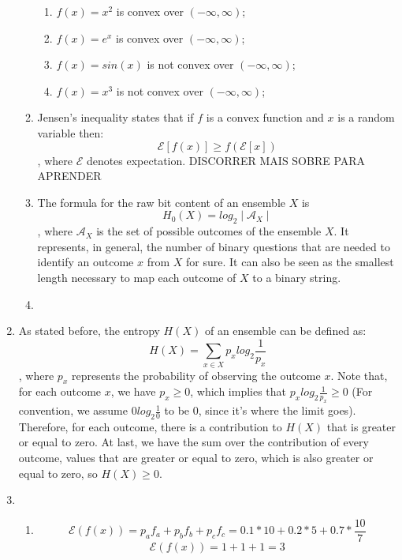 \documentclass{article}
\begin{document}
\begin{enumerate}
\begin{enumerate}
		            \begin{enumerate}
			            \item \(f(x) = x^2\) is convex over \((-\infty, \infty)\);
			            \item \(f(x) = e^x\) is convex over \((-\infty, \infty)\);
			            \item \(f(x) = sin(x)\) is not convex over \((-\infty, \infty)\);
			            \item \(f(x) = x^3\) is not convex over \((-\infty, \infty)\);
		            \end{enumerate}
		      \item Jensen's inequality states that if \(f\) is a convex function and \(x\) is a random variable then:
		            \[\mathcal{E}[f(x)] \geq f(\mathcal{E}[x])\],
		            where \(\mathcal{E}\) denotes expectation. DISCORRER MAIS SOBRE PARA APRENDER
		      \item The formula for the raw bit content of an ensemble \(X\) is
		            \[H_0(X) = log_2 \mid\mathcal{A}_X\mid\],
		            where \(\mathcal{A}_X\) is the set of possible outcomes of the ensemble \(X\). It represents, in general, the number of binary questions that are needed to identify an outcome \(x\) from \(X\) for sure. It can also be seen as the smallest length necessary to map each outcome of \(X\) to a binary string.
		      \item
	      \end{enumerate}

	\item As stated before, the entropy \(H(X)\) of an ensemble can be defined as:
	      \[H(X) = \sum_{x \in X} p_x log_2 \frac{1}{p_x}\],
	      where \(p_x\) represents the probability of observing the outcome \(x\).
          Note that, for each outcome \(x\), we have \(p_x \geq 0\), which implies that \(p_x log_2 \frac{1}{p_x} \geq 0\) (For convention, we assume \(0 log_2 \frac{1}{0}\) to be \(0\), since it's where the limit goes). Therefore, for each outcome, there is a contribution to \(H(X)\) that is greater or equal to zero. At last, we have the sum over the contribution of every outcome, values that are greater or equal to zero, which is also greater or equal to zero, so \(H(X) \geq 0\).
	\item \begin{enumerate}

		      \item
		            \[\mathcal{E}(f(x)) = p_a f_a + p_b f_b + p_c f_c = 0.1 * 10 + 0.2 * 5 + 0.7 * \frac{10}{7}\]
		            \[\mathcal{E}(f(x)) = 1 + 1 + 1 = 3\]


\end{enumerate}
\end{enumerate}
\end{document}
